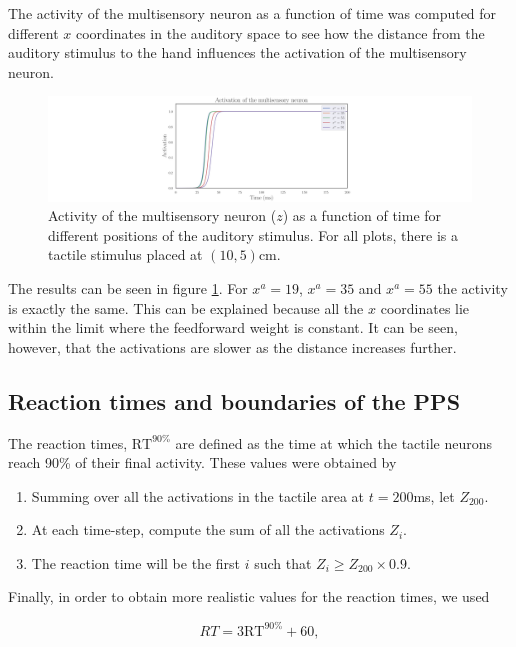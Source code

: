 \documentclass[12pt]{article}
\begin{document}
The activity of the multisensory neuron as a function of time was computed for different $x$ coordinates in the auditory space to see how the distance from the auditory stimulus to the hand influences the activation of the multisensory neuron.

\begin{figure}[h!]
	\centering
	\hspace*{-1.5in}
	\includegraphics[width=1.5\linewidth]{fig/4-1.png}
	\caption{Activity of the multisensory neuron ($z$) as a function of time for different positions of the auditory stimulus. For all plots, there is a tactile stimulus placed at $(10,5)$cm.}
	\label{fig:3.4.1}
\end{figure}

The results can be seen in figure \ref{fig:3.4.1}. For $x^a=19$, $x^a=35$ and $x^a=55$ the activity is exactly the same. This can be explained because all the $x$ coordinates lie within the limit where the feedforward weight is constant. It can be seen, however, that the activations are slower as the distance increases further.

\subsection{Reaction times and boundaries of the PPS}

The reaction times, $\mathrm{RT}^{90\%}$ are defined as the time at which the tactile neurons reach 90\% of their final activity. These values were obtained by
\begin{enumerate}
  \item Summing over all the activations in the tactile area at $t=200$ms, let $Z_{200}$.
  \item At each time-step, compute the sum of all the activations $Z_i$.
  \item The reaction time will be the first $i$ such that  $Z_i \geq Z_{200} \times 0.9$.
\end{enumerate}

Finally, in order to obtain more realistic values for the reaction times, we used

\[RT = 3\mathrm{RT}^{90\%} + 60, \]
\end{document}

